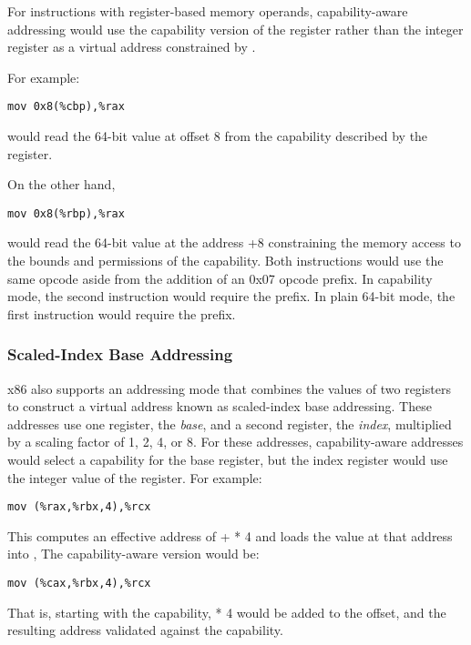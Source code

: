 For instructions with register-based memory operands, capability-aware
addressing would use the capability version of the register rather
than the integer register as a virtual address constrained by \DDC{}.

For example:

\begin{verbatim}
mov 0x8(%cbp),%rax
\end{verbatim}

would read the 64-bit value at offset 8 from the capability described
by the \CBP{} register.

On the other hand,

\begin{verbatim}
mov 0x8(%rbp),%rax
\end{verbatim}

would read the 64-bit value at the address \RBP{}+8 constraining the
memory access to the bounds and permissions of the \DDC{} capability.
Both instructions would use the same opcode aside from the addition of
an 0x07 opcode prefix.  In capability mode, the second
instruction would require the prefix.  In plain 64-bit mode,
the first instruction would require the prefix.

\subsubsection{Scaled-Index Base Addressing}

x86 also supports an addressing mode that combines the values of two
registers to construct a virtual address known as scaled-index base
addressing.  These addresses use one register, the \emph{base}, and a
second register, the \emph{index}, multiplied by a scaling factor of 1, 2,
4, or 8.  For these addresses, capability-aware addresses would select
a capability for the base register, but the index register would use
the integer value of the register.  For example:

\begin{verbatim}
mov (%rax,%rbx,4),%rcx
\end{verbatim}

This computes an effective address of \RAX{} + \RBX{} * 4 and loads the value
at that address into \RCX{},  The capability-aware version would be:

\begin{verbatim}
mov (%cax,%rbx,4),%rcx
\end{verbatim}

That is, starting with the \CAX{} capability, \RBX{} * 4 would be added to the
offset, and the resulting address validated against the \CAX{} capability.

